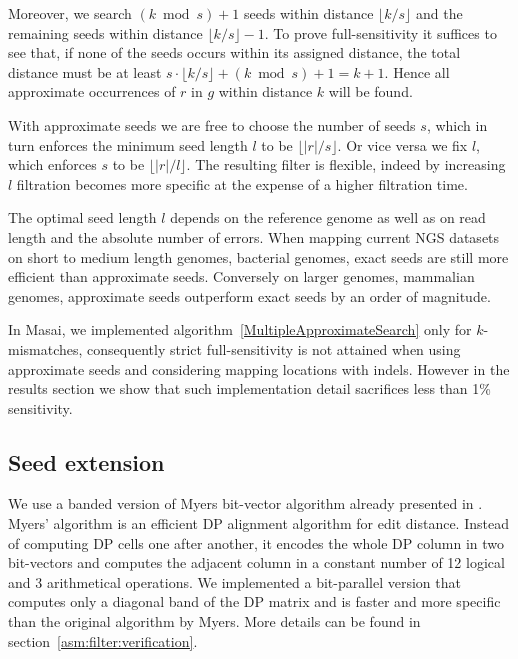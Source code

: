 Moreover, we search $(k \bmod{s}) + 1$ seeds within distance $\lfloor k/s \rfloor$ and the remaining seeds within distance $\lfloor k/s \rfloor - 1$.
To prove full-sensitivity it suffices to see that, if none of the seeds occurs within its assigned distance, the total distance must be at least $s \cdot \lfloor k/s \rfloor + (k \bmod s) + 1 = k + 1$.
Hence all approximate occurrences of $r$ in $g$ within distance $k$ will be found.

With approximate seeds we are free to choose the number of seeds $s$, which in turn enforces the minimum seed length $l$ to be $\lfloor |r|/s \rfloor$.
Or vice versa we fix $l$, which enforces $s$ to be $\lfloor |r|/l \rfloor$.
The resulting filter is flexible, indeed by increasing $l$ filtration becomes more specific at the expense of a higher filtration time.

The optimal seed length $l$ depends on the reference genome as well as on read length and the absolute number of errors.
When mapping current NGS datasets on short to medium length genomes, \eg bacterial genomes, exact seeds are still more efficient than approximate seeds.
Conversely on larger genomes, \eg mammalian genomes, approximate seeds outperform exact seeds by an order of magnitude.

In Masai, we implemented algorithm~\ref{MultipleApproximateSearch} only for $k$-mismatches, consequently strict full-sensitivity is not attained when using approximate seeds and considering mapping locations with indels.
However in the results section we show that such implementation detail sacrifices less than 1\% sensitivity.

\subsection{Seed extension}
\label{masai:engineering:extension}

We use a banded version of Myers bit-vector algorithm \citep{Myers1999} already presented in \citep{Razers3}.
Myers' algorithm is an efficient DP alignment algorithm \citep{Needleman1970} for edit distance. 
Instead of computing DP cells one after another, it encodes the whole DP column in two bit-vectors and computes the adjacent column in a constant number of 12 logical and 3 arithmetical operations.
We implemented a bit-parallel version that computes only a diagonal band of the DP matrix and is faster and more specific than the original algorithm by Myers.
More details can be found in section~\ref{asm:filter:verification}.

